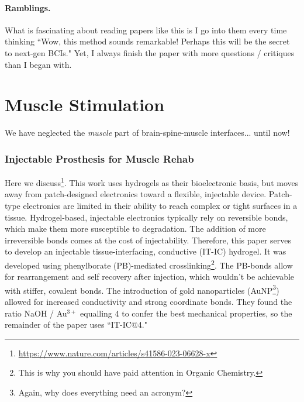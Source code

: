 \subsubsection{Ramblings.}

What is fascinating about reading papers like this is I go into them every time thinking ``Wow, this method sounds remarkable! Perhaps this will be the secret to next-gen BCIs." Yet, I always finish the paper with more questions / critiques than I began with. 





\chapter{Muscle Stimulation}

We have neglected the \textit{muscle} part of brain-spine-muscle interfaces... until now! 

\subsection{Injectable Prosthesis for Muscle Rehab}

Here we discuss\footnote{\url{https://www.nature.com/articles/s41586-023-06628-x}}. This work uses hydrogels as their bioelectronic basis, but moves away from patch-designed electronics toward a flexible, injectable device. Patch-type electronics are limited in their ability to reach complex or tight surfaces in a tissue. Hydrogel-based, injectable electronics typically rely on reversible bonds, which make them more susceptible to degradation. The addition of more irreversible bonds comes at the cost of injectability. Therefore, this paper serves to develop an injectable tissue-interfacing, conductive  (IT-IC) hydrogel. It was developed using phenylborate (PB)-mediated crosslinking\footnote{This is why you should have paid attention in Organic Chemistry.}. The PB-bonds allow for rearrangement and self recovery after injection, which wouldn't be achievable with stiffer, covalent bonds. The introduction of gold nanoparticles (AuNP\footnote{Again, why does everything need an acronym?}) allowed for increased conductivity and strong coordinate bonds. They found the ratio NaOH / Au$^{3+}$ equalling 4 to confer the best mechanical properties, so the remainder of the paper uses ``IT-IC@4."\newline

